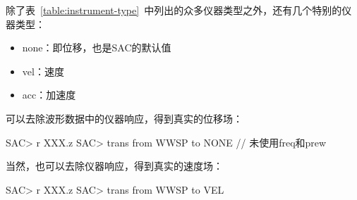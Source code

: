 除了表~\ref{table:instrument-type}~中列出的众多仪器类型之外，还有几个特别的仪器类型：
\begin{itemize}
\item none：即位移，也是SAC的默认值
\item vel：速度
\item acc：加速度
\end{itemize}

可以去除波形数据中的仪器响应，得到真实的位移场：
\begin{SACCode}
SAC> r XXX.z
SAC> trans from WWSP to NONE            // 未使用freq和prew
\end{SACCode}
当然，也可以去除仪器响应，得到真实的速度场：
\begin{SACCode}
SAC> r XXX.z
SAC> trans from WWSP to VEL
\end{SACCode}

